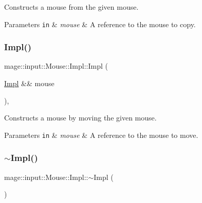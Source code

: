 Constructs a mouse from the given mouse.


\begin{DoxyParams}[1]{Parameters}
\mbox{\tt in}  & {\em mouse} & A reference to the mouse to copy. \\
\hline
\end{DoxyParams}
\hypertarget{classmage_1_1input_1_1_mouse_1_1_impl_a8eed1c46d32964cb28b999b28c39a2b7}{}\label{classmage_1_1input_1_1_mouse_1_1_impl_a8eed1c46d32964cb28b999b28c39a2b7} 
\subsubsection{\texorpdfstring{Impl()}{Impl()}\hspace{0.1cm}{\footnotesize\ttfamily [3/3]}}
{\footnotesize\ttfamily mage\+::input\+::\+Mouse\+::\+Impl\+::\+Impl (\begin{DoxyParamCaption}\item[{\hyperlink{classmage_1_1input_1_1_mouse_1_1_impl}{Impl} \&\&}]{mouse }\end{DoxyParamCaption})\hspace{0.3cm}{\ttfamily [default]}, {\ttfamily [noexcept]}}

Constructs a mouse by moving the given mouse.


\begin{DoxyParams}[1]{Parameters}
\mbox{\tt in}  & {\em mouse} & A reference to the mouse to move. \\
\hline
\end{DoxyParams}
\hypertarget{classmage_1_1input_1_1_mouse_1_1_impl_a0e1f64d2fadbd25d216e0495d141b867}{}\label{classmage_1_1input_1_1_mouse_1_1_impl_a0e1f64d2fadbd25d216e0495d141b867} 
\subsubsection{\texorpdfstring{$\sim$\+Impl()}{~Impl()}}
{\footnotesize\ttfamily mage\+::input\+::\+Mouse\+::\+Impl\+::$\sim$\+Impl (\begin{DoxyParamCaption}{ }\end{DoxyParamCaption})\hspace{0.3cm}{\ttfamily [default]}}


